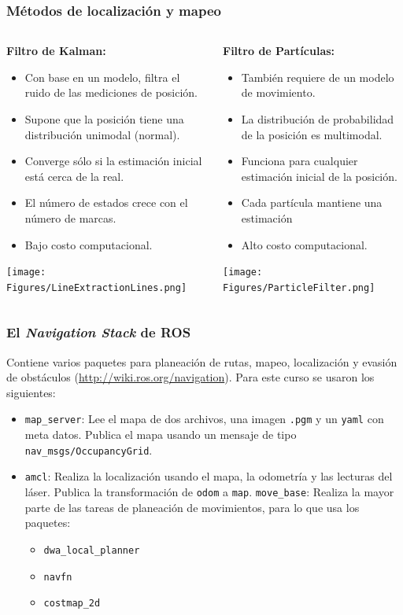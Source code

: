 \documentclass[10pt,spanish,aspectratio=1610]{beamer}
\begin{document}
\begin{frame}\frametitle{Métodos de localización y mapeo}
  \begin{columns}
    \begin{column}{0.45\textwidth}
      \textbf{Filtro de Kalman:} 
      \begin{itemize}
      \item Con base en un modelo, filtra el ruido de las mediciones de posición.
      \item Supone que la posición tiene una distribución unimodal (normal).
      \item Converge sólo si la estimación inicial está cerca de la real.
      \item El número de estados crece con el número de marcas.
      \item Bajo costo computacional.
      \end{itemize}
      \texttt{[image: Figures/LineExtractionLines.png]}
    \end{column}
    \begin{column}{0.45\textwidth}
      \textbf{Filtro de Partículas:}
      \begin{itemize}
      \item También requiere de un modelo de movimiento.
      \item La distribución de probabilidad de la posición es multimodal.
      \item Funciona para cualquier estimación inicial de la posición.
        \item Cada partícula mantiene una estimación
      \item Alto costo computacional.
      \end{itemize}
      \texttt{[image: Figures/ParticleFilter.png]}
    \end{column}
  \end{columns}
\end{frame}


\begin{frame}\frametitle{El \textit{Navigation Stack} de ROS}
  Contiene varios paquetes para planeación de rutas, mapeo, localización y evasión de obstáculos (\url{http://wiki.ros.org/navigation}). Para este curso se usaron los siguientes:
  \begin{itemize}
  \item \texttt{map\_server}: Lee el mapa de dos archivos, una imagen \texttt{.pgm} y un \texttt{yaml} con meta datos. Publica el mapa usando un mensaje de tipo \texttt{nav\_msgs/OccupancyGrid}.
  \item \texttt{amcl}: Realiza la localización usando el mapa, la odometría y las lecturas del láser. Publica la transformación de \texttt{odom} a \texttt{map}.
    \texttt{move\_base}: Realiza la mayor parte de las tareas de planeación de movimientos, para lo que usa los paquetes:
    \begin{itemize}
    \item \texttt{dwa\_local\_planner}
    \item \texttt{navfn}
    \item \texttt{costmap\_2d}
    \end{itemize}
  \end{itemize}
\end{frame}
\end{document}
